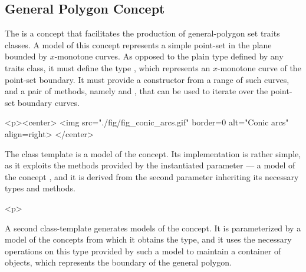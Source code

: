 \subsection{General Polygon Concept}
\label{bso_ssec:general_polygon_concept}
The  is a concept that facilitates the
production of general-polygon set traits classes. A model of this
concept represents a simple point-set in the plane bounded
by $x$-monotone curves. As opposed to the plain
 type defined by any traits class, it must
define the type , which represents an
$x$-monotone curve of the point-set boundary. It must provide a
constructor from a range of such curves, and a pair of methods, namely
 and , that can be used to
iterate over the point-set boundary curves.
 
\lcHtml{\label{fig:conics}}
\begin{ccHtmlOnly}
  <p><center>
    <img src="./fig/fig_conic_arcs.gif" border=0 alt="Conic arcs" align=right>
  </center>
\end{ccHtmlOnly}
The 
class template is a model of the 
concept. Its implementation is rather simple, as it exploits the
methods provided by the instantiated parameter
 --- a model of the concept
, and it is derived from the second
parameter  inheriting its necessary types
and methods. 

\begin{ccHtmlOnly}<p>\end{ccHtmlOnly}
A second class-template
generates models of the  concept. It is
parameterized by a model of the 
concepts from which it obtains the  type, and
it uses the necessary operations on this type provided by such a model
to maintain a container of  objects, which
represents the boundary of the general polygon.

